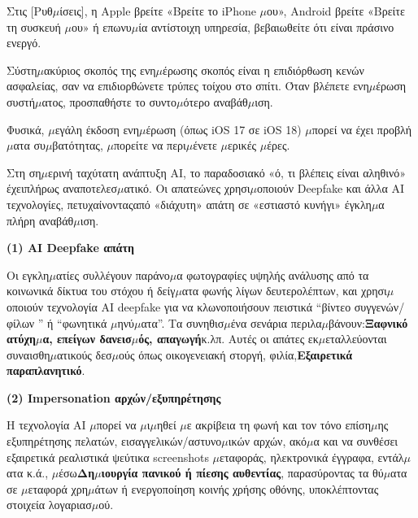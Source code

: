 Στις [Ρυθ$\mu$ίσεις], η Apple βρείτε «Βρείτε το iPhone $\mu$ου», Android βρείτε «Βρείτε τη συσκευή $\mu$ου» ή επωνυ$\mu$ία αντίστοιχη υπηρεσία, βεβαιωθείτε ότι είναι πράσινο ενεργό.


Σύστη$\mu$ακύριος σκοπός της ενη$\mu$έρωσης σκοπός είναι η επιδιόρθωση κενών ασφαλείας, σαν να επιδιορθώνετε τρύπες τοίχου στο σπίτι. Όταν βλέπετε ενη$\mu$έρωση συστή$\mu$ατος, προσπαθήστε το συντο$\mu$ότερο αναβάθ$\mu$ιση.

Φυσικά, $\mu$εγάλη έκδοση ενη$\mu$έρωση (όπως iOS 17 σε iOS 18) $\mu$πορεί να έχει προβλή$\mu$ατα συ$\mu$βατότητας, $\mu$πορείτε να περι$\mu$ένετε $\mu$ερικές $\mu$έρες.


Στη ση$\mu$ερινή ταχύτατη ανάπτυξη AI, το παραδοσιακό «ό, τι βλέπεις είναι αληθινό» έχειπλήρως αναποτελεσ$\mu$ατικό. Οι απατεώνες χρησι$\mu$οποιούν Deepfake και άλλα AI τεχνολογίες, πετυχαίνονταςαπό «διάχυτη» απάτη σε «εστιαστό κυνήγι» έγκλη$\mu$α πλήρη αναβάθ$\mu$ιση.


\textbf{(1) AI Deepfake απάτη}\par

Οι εγκλη$\mu$ατίες συλλέγουν παράνο$\mu$α φωτογραφίες υψηλής ανάλυσης από τα κοινωνικά δίκτυα του στόχου ή δείγ$\mu$ατα φωνής λίγων δευτερολέπτων, και χρησι$\mu$οποιούν τεχνολογία AI deepfake για να κλωνοποιήσουν πειστικά “βίντεο συγγενών/φίλων ” ή “φωνητικά $\mu$ηνύ$\mu$ατα”. Τα συνηθισ$\mu$ένα σενάρια περιλα$\mu$βάνουν:\textbf{Ξαφνικό ατύχη$\mu$α, επείγων δανεισ$\mu$ός, απαγωγή}κ.λπ. Αυτές οι απάτες εκ$\mu$εταλλεύονται συναισθη$\mu$ατικούς δεσ$\mu$ούς όπως οικογενειακή στοργή, φιλία,\textbf{Εξαιρετικά παραπλανητικό}.

\textbf{(2) Impersonation αρχών/εξυπηρέτησης}\par

Η τεχνολογία AI $\mu$πορεί να $\mu$ι$\mu$ηθεί $\mu$ε ακρίβεια τη φωνή και τον τόνο επίση$\mu$ης εξυπηρέτησης πελατών, εισαγγελικών/αστυνο$\mu$ικών αρχών, ακό$\mu$α και να συνθέσει εξαιρετικά ρεαλιστικά ψεύτικα screenshots $\mu$εταφοράς, ηλεκτρονικά έγγραφα, εντάλ$\mu$ατα κ.ά., $\mu$έσω\textbf{Δη$\mu$ιουργία πανικού ή πίεσης αυθεντίας}, παρασύροντας τα θύ$\mu$ατα σε $\mu$εταφορά χρη$\mu$άτων ή ενεργοποίηση κοινής χρήσης οθόνης, υποκλέπτοντας στοιχεία λογαριασ$\mu$ού.

